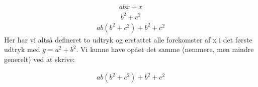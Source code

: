 \documentclass[letterpaper,10pt,english]{jupyterBook}
\begin{document}
\begin{sphinxVerbatim}[commandchars=\\\{\}]
          
        

        

 
\end{sphinxVerbatim}
\begin{equation*}
\begin{split}\displaystyle a b x + x\end{split}
\end{equation*}\begin{equation*}
\begin{split}\displaystyle b^{2} + c^{2}\end{split}
\end{equation*}\begin{equation*}
\begin{split}\displaystyle a b \left(b^{2} + c^{2}\right) + b^{2} + c^{2}\end{split}
\end{equation*}
Her har vi altså defineret to udtryk og erstattet alle forekomster af x i det første udtryk med \(g = a^2 + b^2\). Vi kunne have opået det samme (nemmere, men mindre generelt) ved at skrive:

\begin{sphinxVerbatim}[commandchars=\\\{\}]
        
        

\end{sphinxVerbatim}
\begin{equation*}
\begin{split}\displaystyle a b \left(b^{2} + c^{2}\right) + b^{2} + c^{2}\end{split}
\end{equation*}
\end{document}

